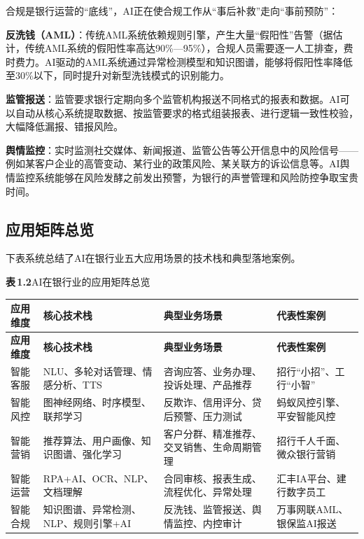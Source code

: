 合规是银行运营的``底线''，AI正在使合规工作从``事后补救''走向``事前预防''：

\textbf{反洗钱（AML）}：传统AML系统依赖规则引擎，产生大量``假阳性''告警（据估计，传统AML系统的假阳性率高达90\%—95\%），合规人员需要逐一人工排查，费时费力。AI驱动的AML系统通过异常检测模型和知识图谱，能够将假阳性率降低至30\%以下，同时提升对新型洗钱模式的识别能力。

\textbf{监管报送}：监管要求银行定期向多个监管机构报送不同格式的报表和数据。AI可以自动从核心系统提取数据、按监管要求的格式组装报表、进行逻辑一致性校验，大幅降低漏报、错报风险。

\textbf{舆情监控}：实时监测社交媒体、新闻报道、监管公告等公开信息中的风险信号——例如某客户企业的高管变动、某行业的政策风险、某关联方的诉讼信息等。AI舆情监控系统能够在风险发酵之前发出预警，为银行的声誉管理和风险防控争取宝贵时间。

\subsection{应用矩阵总览}

下表系统总结了AI在银行业五大应用场景的技术栈和典型落地案例。

\vspace{1em}

\noindent\textbf{表\,1.2}\quad AI在银行业的应用矩阵总览

\vspace{0.5em}

\begin{longtable}{p{2cm} p{3.5cm} p{4cm} p{4.5cm}}
\toprule
\textbf{应用维度} & \textbf{核心技术栈} & \textbf{典型业务场景} & \textbf{代表性案例} \\
\midrule
\endfirsthead

\toprule
\textbf{应用维度} & \textbf{核心技术栈} & \textbf{典型业务场景} & \textbf{代表性案例} \\
\midrule
\endhead

智能客服 & NLU、多轮对话管理、情感分析、TTS & 咨询应答、业务办理、投诉处理、产品推荐 & 招行``小招''、工行``小智'' \\

智能风控 & 图神经网络、时序模型、联邦学习 & 反欺诈、信用评分、贷后预警、压力测试 & 蚂蚁风控引擎、平安智能风控 \\

智能营销 & 推荐算法、用户画像、知识图谱、强化学习 & 客户分群、精准推荐、交叉销售、生命周期管理 & 招行千人千面、微众银行营销 \\

智能运营 & RPA+AI、OCR、NLP、文档理解 & 合同审核、报表生成、流程优化、异常处理 & 汇丰IA平台、建行数字员工 \\

智能合规 & 知识图谱、异常检测、NLP、规则引擎+AI & 反洗钱、监管报送、舆情监控、内控审计 & 万事网联AML、银保监AI报送 \\

\bottomrule
\end{longtable}


